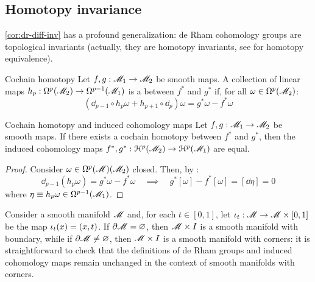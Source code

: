 \subsection{Homotopy invariance}

\cref{cor:dr-diff-inv} has a profound generalization: de Rham cohomology groups are topological invariants (actually, they are homotopy invariants, see  for homotopy equivalence).

\begin{definition}{Cochain homotopy}{}
  Let $ f , g : \mathscr{M}_1 \rightarrow \mathscr{M}_2 $ be smooth maps. A collection of linear maps $ h_p : \Omega^{p}(\mathscr{M}_2) \rightarrow \Omega^{p-1}(\mathscr{M}_1) $ is a  between $ f^* $ and $ g^* $ if, for all $ \omega \in \Omega^{p}(\mathscr{M}_2) $:
  \begin{equation}
    (\dd_{p-1} \circ h_p \omega + h_{p+1} \circ \dd_p) \omega = g^* \omega - f^* \omega
    \label{eq:cochain-homotopy-def}
  \end{equation}
\end{definition}

\begin{proposition}{Cochain homotopy and induced cohomology maps}{}
  Let $ f , g : \mathscr{M}_1 \rightarrow \mathscr{M}_2 $ be smooth maps. If there exists a cochain homotopy between $ f^* $ and $ g^* $, then the induced cohomology maps $ f^* , g^* : \EuScript{H}^{p}(\mathscr{M}_2) \rightarrow \EuScript{H}^{p}(\mathscr{M}_1) $ are equal.
\end{proposition}

\begin{proofbox}
  \begin{proof}
    Consider $ \omega \in \Omega^{p}(\mathscr{M})(\mathscr{M}_2) $ closed. Then, by :
    \begin{equation*}
      \dd_{p-1} (h_p \omega) = g^* \omega - f^* \omega
      \quad \implies \quad
      g^* [\omega] - f^* [\omega] = [\dd \eta] = 0
    \end{equation*}
    where $ \eta \equiv h_p \omega \in \Omega^{p-1}(\mathscr{M}_1) $.
  \end{proof}
\end{proofbox}

Consider a smooth manifold $ \mathscr{M} $ and, for each $ t \in [0,1] $, let $ \iota_t : \mathscr{M} \rightarrow \mathscr{M} \times [0,1] $ be the map $ \iota_t(x) = (x,t) $. If $ \partial \mathscr{M} = \varnothing $, then $ \mathscr{M} \times I $ is a smooth manifold with boundary, while if $ \partial \mathscr{M} \neq \varnothing $, then $ \mathscr{M} \times I $ is a smooth manifold with corners: it is straightforward to check that the definitions of de Rham groups and induced cohomology maps remain unchanged in the context of smooth manifolds with corners.

